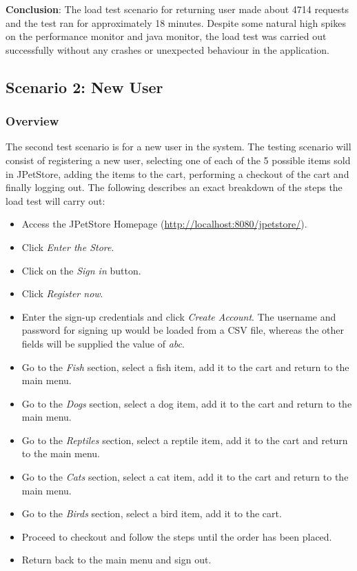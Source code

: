 \documentclass[fontsize=12pt,paper=letter,twoside]{scrartcl}
\begin{document}
\smallskip
\noindent \textbf{Conclusion}: The load test scenario for returning user made about 4714 requests and the test ran for approximately 18 minutes. Despite some natural high spikes on the performance monitor and java monitor, the load test was carried out successfully without any crashes or unexpected behaviour in the application.


\newpage
\subsection{Scenario 2: New User}

\subsubsection{Overview}
The second test scenario is for a new user in the system. The testing scenario will consist of registering a new user, selecting one of each of the 5 possible items sold in JPetStore, adding the items to the cart, performing a checkout of the cart and finally logging out. The following describes an exact breakdown of the steps the load test will carry out:

\begin{itemize}
\item Access the JPetStore Homepage (\url{http://localhost:8080/jpetstore/}).
\item Click \emph{Enter the Store}.
\item Click on the \emph{Sign in} button.
\item Click \emph{Register now}.
\item Enter the sign-up credentials and click \emph{Create Account}. The username and password for signing up would be loaded from a CSV file, whereas the other fields will be supplied the value of \emph{abc}.
\item Go to the \emph{Fish} section, select a fish item, add it to the cart and return to the main menu.
\item Go to the \emph{Dogs} section, select a dog item, add it to the cart and return to the main menu.
\item Go to the \emph{Reptiles} section, select a reptile item, add it to the cart and return to the main menu.
\item Go to the \emph{Cats} section, select a cat item, add it to the cart and return to the main menu.
\item Go to the \emph{Birds} section, select a bird item, add it to the cart.
\item Proceed to checkout and follow the steps until the order has been placed.
\item Return back to the main menu and sign out.
\end{itemize}
\end{document}
